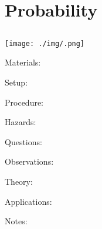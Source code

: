 \section{Probability}

\begin{multicols}{2}


\section*{}


\subsection{}

\begin{center}
\texttt{[image: ./img/.png]}
\end{center}

\begin{description*}
\item[Materials:]{}
\item[Setup:]{}
\item[Procedure:]{}
\item[Hazards:]{}
\item[Questions:]{}
\item[Observations:]{}
\item[Theory:]{}
\item[Applications:]{}
\item[Notes:]{}
\end{description*}



\end{multicols}

\pagebreak